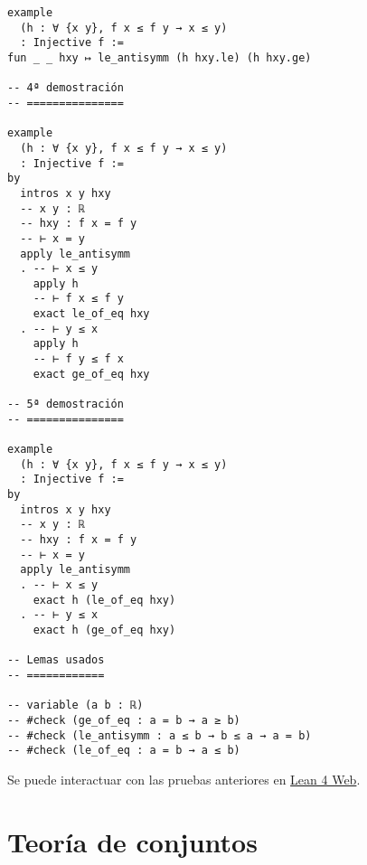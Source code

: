 \begin{verbatim}
example
  (h : ∀ {x y}, f x ≤ f y → x ≤ y)
  : Injective f :=
fun _ _ hxy ↦ le_antisymm (h hxy.le) (h hxy.ge)

-- 4ª demostración
-- ===============

example
  (h : ∀ {x y}, f x ≤ f y → x ≤ y)
  : Injective f :=
by
  intros x y hxy
  -- x y : ℝ
  -- hxy : f x = f y
  -- ⊢ x = y
  apply le_antisymm
  . -- ⊢ x ≤ y
    apply h
    -- ⊢ f x ≤ f y
    exact le_of_eq hxy
  . -- ⊢ y ≤ x
    apply h
    -- ⊢ f y ≤ f x
    exact ge_of_eq hxy

-- 5ª demostración
-- ===============

example
  (h : ∀ {x y}, f x ≤ f y → x ≤ y)
  : Injective f :=
by
  intros x y hxy
  -- x y : ℝ
  -- hxy : f x = f y
  -- ⊢ x = y
  apply le_antisymm
  . -- ⊢ x ≤ y
    exact h (le_of_eq hxy)
  . -- ⊢ y ≤ x
    exact h (ge_of_eq hxy)

-- Lemas usados
-- ============

-- variable (a b : ℝ)
-- #check (ge_of_eq : a = b → a ≥ b)
-- #check (le_antisymm : a ≤ b → b ≤ a → a = b)
-- #check (le_of_eq : a = b → a ≤ b)
\end{verbatim}
Se puede interactuar con las pruebas anteriores en \href{https://lean.math.hhu.de/\#url=https://raw.githubusercontent.com/jaalonso/Calculemus2/main/src/Si\_f(x)\_leq\_f(y)\_to\_x\_leq\_y,\_entonces\_f\_es\_inyectiva.lean}{Lean 4 Web}.

\chapter{Teoría de conjuntos}
\label{sec:org85026a2}

